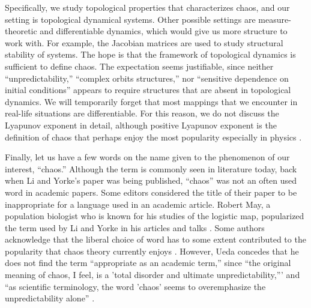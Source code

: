 \documentclass[10pt,twoside]{book}
\begin{document}
Specifically, we study topological properties that characterizes chaos, and our setting is topological dynamical systems.
Other possible settings are measure-theoretic and differentiable dynamics, which would give us more structure to work with.
For example, the Jacobian matrices are used to study structural stability of systems.
The hope is that the framework of topological dynamics is sufficient to define chaos.
The expectation seems justifiable, since neither ``unpredictability,'' ``complex orbits structures,'' nor ``sensitive dependence on initial conditions'' appears to require structures that are absent in topological dynamics.
We will temporarily forget that most mappings that we encounter in real-life situations are differentiable.
For this reason, we do not discuss the Lyapunov exponent in detail, although positive Lyapunov exponent is the definition of chaos that perhaps enjoy the most popularity especially in physics \citep{kantz-schreiber}.


Finally, let us have a few words on the name given to the phenomenon of our interest, ``chaos.''
Although the term is commonly seen in literature today, back when Li and Yorke's paper was being published, ``chaos'' was not an often used word in academic papers.
Some editors considered the title of their paper to be inappropriate for a language used in an academic article.
Robert May, a population biologist who is known for his studies of the logistic map, popularized the term used by Li and Yorke in his articles \citeyearpar{may1,may2} and talks \citep[p.205]{ueda-abraham}.
Some authors acknowledge that the liberal choice of word has to some extent contributed to the popularity that chaos theory currently enjoys \citep[``Exploring Chaos on an Interval'']{ueda-abraham}.
However, Ueda concedes that he does not find the term ``appropriate as an academic term,'' since ``the original meaning of chaos, I feel, is a 'total disorder and ultimate unpredictability,''' and ``as scientific terminology, the word 'chaos' seems to overemphasize the unpredictability alone'' \citet[p.24]{ueda-abraham}.
\end{document}

